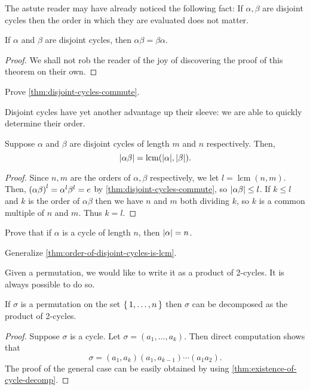 \documentclass[./main.tex]{subfiles}
\begin{document}
The astute reader may have already noticed the following fact: If $\alpha,
\beta$ are disjoint cycles then the order in which they are evaluated does not
matter.
\begin{theorem}
\label{thm:disjoint-cycles-commute}
    If $\alpha$ and $\beta$ are disjoint cycles, then $\alpha\beta =
    \beta\alpha$.
\end{theorem}
\begin{proof}
    We shall not rob the reader of the joy of discovering the proof of this
    theorem on their own.
\end{proof}
\begin{exercise}
    Prove \cref{thm:disjoint-cycles-commute}.
\end{exercise}

Disjoint cycles have yet another advantage up their sleeve: we are able to
quickly determine their order.

\begin{theorem}
\label{thm:order-of-disjoint-cycles-is-lcm}
    Suppose $\alpha$ and $\beta$ are disjoint cycles of length $m$ and $n$
    respectively. Then, 
    \[
    \abs{\alpha \beta} = \operatorname{lcm}(\abs \alpha, \abs \beta).
    \]
\end{theorem}
\begin{proof}
    Since $n, m$ are the orders of $\alpha, \beta$ respectively, we let $l =
    \operatorname{lcm}(n, m)$. Then, $\paren{\alpha \beta}^{l} = \alpha^l
    \beta^l = e$ by \cref{thm:disjoint-cycles-commute}, so $\abs{\alpha \beta}
    \leq l$. If $k \leq l$ and $k$ is the order of $\alpha\beta$ then we have
    $n$ and $m$ both dividing $k$, so $k$ is a common multiple of $n$ and $m$.
    Thus $k = l$.
\end{proof}

\begin{exercise}
    Prove that if $\alpha$ is a cycle of length $n$, then $\abs{\alpha} = n$.
\end{exercise}
\begin{exercise}
    Generalize \cref{thm:order-of-disjoint-cycles-is-lcm}.
\end{exercise}

Given a permutation, we would like to write it as a product of 2-cycles.
It is always possible to do so.

\begin{proposition}
    If $\sigma$ is a permutation on the set $\set{1, \dots, n}$ then $\sigma$
    can be decomposed as the product of 2-cycles. 
\end{proposition}
\begin{proof}
    Suppose $\sigma$ is a cycle. Let $\sigma = (a_1, \dots, a_k)$. Then direct
    computation shows that
    \[
        \sigma = (a_1, a_k) (a_1, a_{k-1}) \cdots (a_1 a_2).
    \]
    The proof of the general case can be easily obtained by using
    \cref{thm:existence-of-cycle-decomp}.
\end{proof}
\end{document}

